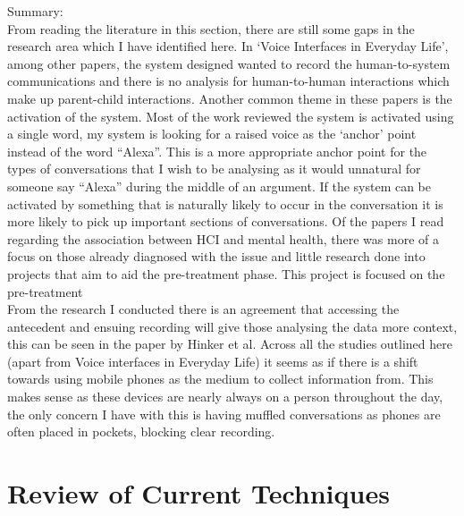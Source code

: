 \documentclass[a4paper,11pt]{report}
\begin{document}
Summary:\\
From reading the literature in this section, there are still some gaps in the research area which I have identified here. In ‘Voice Interfaces in Everyday Life’, among other papers, the system designed wanted to record the human-to-system communications and there is no analysis for human-to-human interactions which make up parent-child interactions. Another common theme in these papers is the activation of the system. Most of the work reviewed the system is activated using a single word, my system is looking for a raised voice as the ‘anchor’ point instead of the word “Alexa”. This is a more appropriate anchor point for the types of conversations that I wish to be analysing as it would unnatural for someone say “Alexa” during the middle of an argument. If the system can be activated by something that is naturally likely to occur in the conversation it is more likely to pick up important sections of conversations. Of the papers I read regarding the association between HCI and mental health, there was more of a focus on those already diagnosed with the issue and little research done into projects that aim to aid the pre-treatment phase. This project is focused on the pre-treatment\\

From the research I conducted there is an agreement that accessing the antecedent and ensuing recording will give those analysing the data more context, this can be seen in the paper by Hinker et al. Across all the studies outlined here (apart from Voice interfaces in Everyday Life) it seems as if there is a shift towards using mobile phones as the medium to collect information from. This makes sense as these devices are nearly always on a person throughout the day, the only concern I have with this is having muffled conversations as phones are often placed in pockets, blocking clear recording.\\

\section{Review of Current Techniques}
\end{document}

